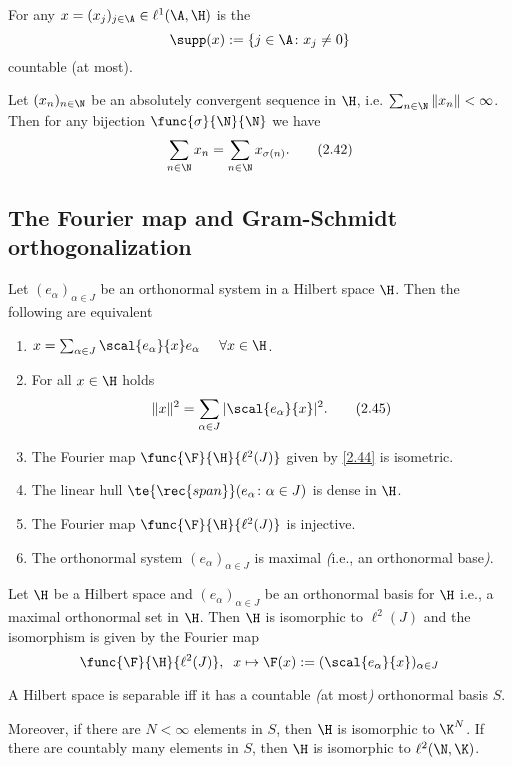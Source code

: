  For any $x=(x_j)_{j\in\A}\in\ell^1(\A,\H)$ is the 
\[\supp(x):=\{j\in\A\colon x_j\neq0\}\]
countable (at most).

 Let $(x_n)_{n\in\N}$ be an absolutely convergent sequence in $\H$, i.e. $\sum_{n\in\N}\|x_n\|<\infty$. Then for any bijection $\func{\sigma}{\N}{\N}$ we have
\[\sum_{n\in\N}x_n=\sum_{n\in\N}x_{\sigma(n)}.\tag{2.42}\label{2.42}\]

\subsection{The Fourier map and Gram-Schmidt orthogonalization}
\begin{thm}\label{ii.20}
	Let $(e_\alpha)_{\alpha\in J}$ be an orthonormal system in a Hilbert space $\H$. Then the following are equivalent
	\begin{enumerate}[label=\alph*)]
		\item $x=\sum_{\alpha\in J}\scal{e_\alpha}{x}e_\alpha\;\;\;\;\;\forall x\in\H$.\label{ii.20.a}
		\item For all $x\in\H$  holds
		\[\|x\|^2=\sum_{\alpha\in J}|\scal{e_\alpha}{x}|^2.\tag{2.45}\label{2.45}\]\label{ii.20.b}
		\item The Fourier map $\func{\F}{\H}{\ell^2(J)}$ given by \eqref{2.44} is isometric.\label{ii.20.c}
		\item The linear hull $\te{\rec{span}}(e_\alpha\colon{\alpha\in J})$ is dense in $\H$.\label{ii.20.d}
		\item The Fourier map $\func{\F}{\H}{\ell^2(J)}$ is injective.\label{ii.20.e}
		\item The orthonormal system $(e_\alpha)_{\alpha\in J}$ is maximal \emph{(}i.e., an orthonormal base\emph{)}.\label{ii.20.f}
	\end{enumerate}
\end{thm}

\begin{cor}\label{ii.21}
    Let $\H$ be a Hilbert space and $(e_\alpha)_{\alpha\in J}$ be an orthonormal basis for $\H$ \rec{(}i.e., a maximal orthonormal set in $\H$\rec{)}. Then $\H$ is isomorphic to $\ell^2(J)$ and the isomorphism is given by the Fourier map
    \[\func{\F}{\H}{\ell^2(J)},\;\; x\mapsto\F(x):=(\scal{e_\alpha}{x})_{\alpha\in J}\]
\end{cor}

\begin{thm}\label{ii.22}
    A Hilbert space is separable iff it has a countable \emph{(}at most\emph{)} orthonormal basis $S$.

    Moreover, if there are $N<\infty$ elements in $S$, then $\H$ is isomorphic to $\K^N$. If there are countably many elements in $S$, then $\H$ is isomorphic to $\ell^2(\N,\K)$.
\end{thm}


